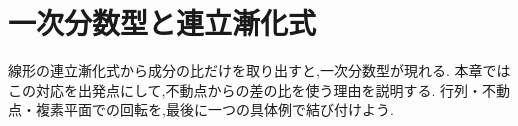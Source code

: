 \chapter{一次分数型と連立漸化式}\label{章：一次分数型と連立漸化式}
\begin{bookcolumns}
線形の連立漸化式から成分の比だけを取り出すと,一次分数型が現れる.
本章ではこの対応を出発点にして,不動点からの差の比を使う理由を説明する.
行列・不動点・複素平面での回転を,最後に一つの具体例で結び付けよう.




\end{bookcolumns}
